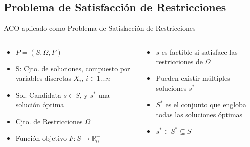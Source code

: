 \subsection{Problema de Satisfacci\'on de Restricciones}
\begin{frame}{ACO aplicado como Problema de Satisfacci\'on de Restricciones}
  \begin{columns}
    \begin{column}{0.5\textwidth}
        \begin{itemize}
          \item $P = (S, \Omega, F)$
          \item S:  Cjto. de soluciones, compuesto por variables discretas $X_{i}$, $i \in 1 \dotsc n$
          \item Sol. Candidata $s \in S$, y $s^{*}$ una soluci\'on \'optima
          \item Cjto. de Restricciones $\Omega$
          \item Funci\'on objetivo $F: S\rightarrow \mathbb R_{0}^{+}$
          
      \end{itemize}
    \end{column}
    \begin{column}{0.5\textwidth}
      \begin{itemize}
          \item $s$ es factible si satisface las restricciones de $\Omega$
          \item Pueden existir m\'ultiples soluciones $s^{*}$
          \item $S^{*}$ es el conjunto que engloba todas las soluciones \'optimas
          \item $s^{*} \in S^{*} \subseteq S$
      \end{itemize}
    \end{column}
\end{columns}
\end{frame}





